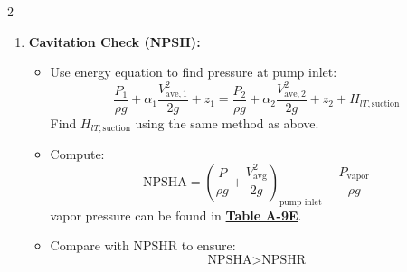 \begin{multicols*}{2}
\begin{enumerate}
        \item \textbf{Cavitation Check (NPSH):}
              \begin{itemize}
                  \item Use energy equation to find pressure at pump inlet:
                        \[
                            \frac{P_1}{\rho g} + \alpha_1 \frac{V_{\text{ave},1}^2}{2g} + z_1 = \frac{P_2}{\rho g} + \alpha_2 \frac{V_{\text{ave},2}^2}{2g} + z_2 + H_{lT, \text{suction}}
                        \]
                        Find $H_{lT, \text{suction}}$ using the same method as above.
                  \item Compute:
                        \[
                            \text{NPSHA} = \left(\frac{P}{\rho g} + \frac{V_\text{avg}^2}{2g} \right)_{\text{pump inlet}} - \frac{P_{\text{vapor}}}{\rho g}
                        \]
                        vapor pressure can be found in \underline{\textbf{Table A-9E}}.
                  \item Compare with NPSHR to ensure:
                        \[
                            \text{NPSHA} > \text{NPSHR}
                        \]
              \end{itemize}
    \end{enumerate}
\end{multicols*}